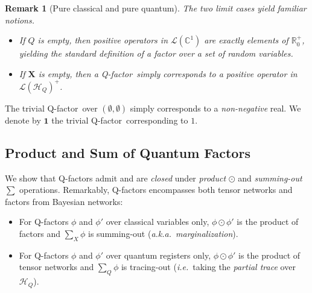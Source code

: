 \documentclass[10pt,a4paper]{article}
\newcommand*{\ie}{\emph{i.e.}\xspace}
\newcommand*{\aka}{\emph{a.k.a.}}
\newcommand{\Real}{\mathbb{R}}
\newcommand*{\compfact}{\odot}
\newcommand{\nnReal}{\Real^+_0}
\newcommand{\ftone}{\mathbf{1}}
\newcommand{\bX}{\mathbf X}
\renewcommand{\L}{\mathcal{L}}
\newcommand{\Pos}[1]{{\L(#1)}^+}
\newcommand*{\C}{\mathbb{C}}
\newcommand{\HH}{\mathcal{H}}
\newcommand{\reg}{Q}
\newcommand{\qreg}{\reg}
\newcommand*{\someqfact}{\phi}
\newcommand*{\qfactor}{Q-factor}
\newtheorem{remark}[theorem]{Remark}
\begin{document}
\begin{remark}[Pure classical and pure quantum]
The two limit cases yield familiar notions.
\begin{itemize}
\item
If $\qreg$ is empty, then positive operators in $\L(\C^1)$ are exactly elements of $\nnReal$, yielding the standard definition of a factor over a set of random variables.
\item
If $\bX$ is empty, then a \qfactor\ simply corresponds to \emph{a positive operator} in $\Pos{\HH_\qreg}$.
\end{itemize}
\end{remark}

The trivial \qfactor\ over $(\emptyset,\emptyset)$ simply corresponds to a \emph{non-negative} real.
We denote by $\ftone$ the trivial \qfactor\ corresponding to $1$.

\subsection{Product and Sum of Quantum Factors}

We show that \qfactor s admit and are \emph{closed} under \emph{product} $\odot$ and \emph{summing-out} $\sum$ operations.
Remarkably, \qfactor s encompasses both tensor networks and factors from Bayesian networks:
\begin{itemize}
\item
For \qfactor s $\someqfact$ and $\someqfact'$ over classical variables only, $\someqfact \compfact \someqfact'$ is the product of factors and $\sum_X \someqfact$ is summing-out (\aka\ \emph{marginalization}).
\item
For \qfactor s $\someqfact$ and $\someqfact'$ over quantum registers only, $\someqfact \compfact \someqfact'$ is the product of tensor networks %
and $\sum_\qreg \someqfact$ is tracing-out (\ie\ taking the \emph{partial trace} over $\HH_\qreg$).
\end{itemize}
\end{document}
